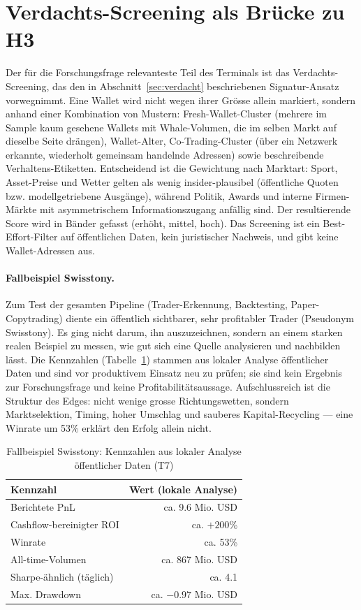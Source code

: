 \section{Verdachts-Screening als Brücke zu H3}
\label{sec:loesung-suspicious}
Der für die Forschungsfrage relevanteste Teil des Terminals ist das
Verdachts-Screening, das den in Abschnitt~\ref{sec:verdacht} beschriebenen
Signatur-Ansatz vorwegnimmt. Eine Wallet wird nicht wegen ihrer Grösse allein
markiert, sondern anhand einer Kombination von Mustern: Fresh-Wallet-Cluster
(mehrere im Sample kaum gesehene Wallets mit Whale-Volumen, die im selben Markt auf
dieselbe Seite drängen), Wallet-Alter, Co-Trading-Cluster (über ein Netzwerk
erkannte, wiederholt gemeinsam handelnde Adressen) sowie beschreibende
Verhaltens-Etiketten. Entscheidend ist die Gewichtung nach Marktart: Sport,
Asset-Preise und Wetter gelten als wenig insider-plausibel (öffentliche Quoten bzw.
modellgetriebene Ausgänge), während Politik, Awards und interne Firmen-Märkte mit
asymmetrischem Informationszugang anfällig sind. Der resultierende Score wird in
Bänder gefasst (erhöht, mittel, hoch). Das Screening ist ein Best-Effort-Filter auf
öffentlichen Daten, kein juristischer Nachweis, und gibt keine Wallet-Adressen aus.

\paragraph{Fallbeispiel Swisstony.}
Zum Test der gesamten Pipeline (Trader-Erkennung, Backtesting, Paper-Copytrading) diente ein öffentlich sichtbarer, sehr profitabler Trader
(Pseudonym Swisstony). Es ging nicht darum, ihn auszuzeichnen, sondern an einem
starken realen Beispiel zu messen, wie gut sich eine Quelle analysieren und
nachbilden lässt. Die Kennzahlen (Tabelle~\ref{tab:t7}) stammen aus lokaler Analyse
öffentlicher Daten und sind vor produktivem Einsatz neu zu prüfen; sie sind kein
Ergebnis zur Forschungsfrage und keine Profitabilitätsaussage. Aufschlussreich ist
die Struktur des Edges: nicht wenige grosse Richtungswetten, sondern
Marktselektion, Timing, hoher Umschlag und sauberes Kapital-Recycling --- eine
Winrate um 53\% erklärt den Erfolg allein nicht.

\begin{table}[ht]
\centering
\caption{Fallbeispiel Swisstony: Kennzahlen aus lokaler Analyse öffentlicher Daten (T7)}
\label{tab:t7}
\small
\begin{tabular}{@{}lr@{}}
\toprule
Kennzahl & Wert (lokale Analyse) \\
\midrule
Berichtete PnL & ca. 9.6 Mio. USD \\
Cashflow-bereinigter ROI & ca. $+200$\% \\
Winrate & ca. 53\% \\
All-time-Volumen & ca. 867 Mio. USD \\
Sharpe-ähnlich (täglich) & ca. 4.1 \\
Max. Drawdown & ca. $-0.97$ Mio. USD \\
\bottomrule
\end{tabular}
\end{table}

